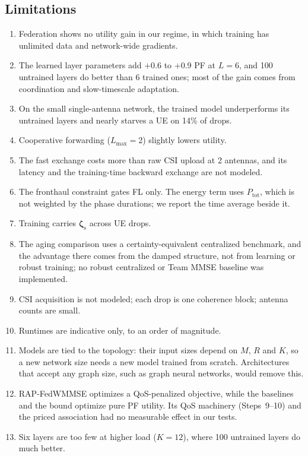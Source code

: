 \documentclass[conference]{IEEEtran}
\newcommand{\zs}{\boldsymbol{\zeta}_{\mathrm{s}}}
\begin{document}
\subsection{Limitations}
\begin{enumerate}
  \item[(i)] Federation shows no utility gain in our regime, in which
    training has unlimited data and network-wide gradients.
  \item[(ii)] The learned layer parameters add $+0.6$ to $+0.9$ PF at $L=6$,
    and 100 untrained layers do better than 6 trained ones; most of the gain
    comes from coordination and slow-timescale adaptation.
  \item[(iii)] On the small single-antenna network, the trained model
    underperforms its untrained layers and nearly starves a UE on 14\% of
    drops.
  \item[(iv)] Cooperative forwarding ($L_{\max}=2$) slightly lowers utility.
  \item[(v)] The fast exchange costs more than raw CSI upload at 2 antennas,
    and its latency and the training-time backward exchange are not
    modeled.
  \item[(vi)] The fronthaul constraint gates FL only. The energy term uses
    $P_{\mathrm{tot}}$, which is not weighted by the phase durations; we
    report the time average beside it.
  \item[(vii)] Training carries $\zs$ across UE drops.
  \item[(viii)] The aging comparison uses a certainty-equivalent centralized
    benchmark, and the advantage there comes from the damped structure, not
    from learning or robust training; no robust centralized or Team MMSE
    baseline was implemented.
  \item[(ix)] CSI acquisition is not modeled; each drop is one coherence
    block; antenna counts are small.
  \item[(x)] Runtimes are indicative only, to an order of magnitude.
  \item[(xi)] Models are tied to the topology: their input sizes depend on
    $M$, $R$ and $K$, so a new network size needs a new model trained from
    scratch. Architectures that accept any graph size, such as graph neural
    networks, would remove this.
  \item[(xii)] RAP-FedWMMSE optimizes a QoS-penalized objective, while the
    baselines and the bound optimize pure PF utility. Its QoS machinery
    (Steps~9--10) and the priced association had no measurable effect in our
    tests.
  \item[(xiii)] Six layers are too few at higher load ($K=12$), where 100
    untrained layers do much better.
\end{enumerate}
\end{document}

